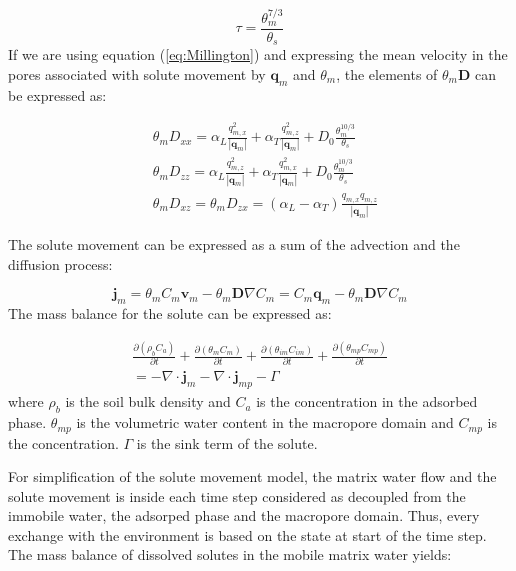 \documentclass{report}
\begin{document}
\begin{equation}
\tau=\frac{\theta_{m}^{7/3}}{\theta_s} \label{eq:Millington}
\end{equation}
%
If we are using equation (\ref{eq:Millington}) and expressing the
mean velocity in the pores associated with solute movement by
$\mathbf{q}_{m}$ and $\theta_{m}$, the elements of
$\theta_{m}\mathbf{D}$ can be expressed as:

\begin{equation}
\begin{split}
&\theta_{m}
D_{xx}=\alpha_L\frac{q_{m,x}^{2}}{|\mathbf{q}_m|}+\alpha_T\frac{q_{m,z}^{2}}
{|\mathbf{q}_{m}|}+D_0\frac{\theta_{m}^{10/3}}{\theta_s} \\
&\theta_{m}
D_{zz}=\alpha_L\frac{q_{m,z}^{2}}{|\mathbf{q}_{m}|}+\alpha_T\frac{q_{m,x}^{2}}
{|\mathbf{q}_{m}|}+D_0\frac{\theta_{m}^{10/3}}{\theta_s} \\
&\theta_{m} D_{xz}=\theta_{m}
  D_{zx}=(\alpha_L-\alpha_T)\frac{q_{m,x}q_{m,z}}{|\mathbf{q}_{m}|}
\end{split}
\label{eq:thetad}
\end{equation}

The solute movement can be expressed as a sum of the advection and
the diffusion process:

\begin{equation}
\mathbf{j}_{m}=\theta_{m} C_{m}\mathbf{v}_{m}
-\theta_{m}\mathbf{D}\nabla C_{m}=C_{m}
\mathbf{q}_{m}-\theta_{m}\mathbf{D}\nabla C_{m}
\label{eq:soltransport}
\end{equation}
%
The mass balance for the solute
can be expressed as:

\begin{eqnarray}
\frac{\partial (\rho_b C_a)}{\partial t} + \frac{\partial
(\theta_{m}
  C_{m})}{\partial t} + \frac{\partial (\theta_{im}
  C_{im})}{\partial t} + \frac{\partial (\theta_{mp}
  C_{mp})}{\partial t} \nonumber \\ =-\nabla \cdot \mathbf{j}_{m}-\nabla
  \cdot \mathbf{j}_{mp} - \Gamma
\label{eq:solmassbal_tot}
\end{eqnarray}
%
where $\rho_b$ is the soil bulk density and $C_a$ is the
concentration in the adsorbed phase. $\theta_{mp}$
is the volumetric water content in the macropore domain and $C_{mp}$
is the concentration. $\Gamma$ is the sink term of the solute.

For simplification of the solute movement model, the matrix water
flow and the solute movement is inside each time step considered as
decoupled from the immobile water, the adsorped phase and the
macropore domain. Thus, every exchange with the environment is based
on the state at start of the time step. The mass balance of
dissolved solutes in the mobile matrix water yields:
\end{document}
